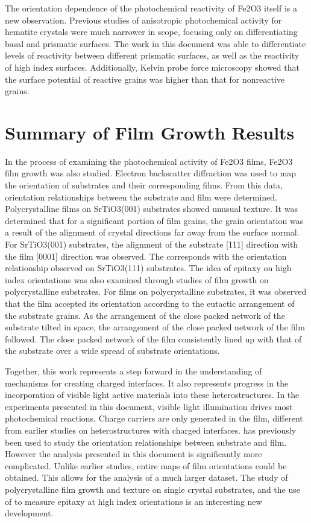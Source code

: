 \documentclass[12pt,%
              twoside,
               letterpaper]{uiothesis}
\begin{document}
The orientation dependence of the photochemical reactivity of Fe2O3 itself is a new
observation. Previous studies of anisotropic photochemical activity for hematite crystals
were much narrower in scope, focusing only on differentiating basal and prismatic
surfaces. The work in this document was able to differentiate levels of reactivity between
different prismatic surfaces, as well as the reactivity of high index surfaces.
Additionally, Kelvin probe force microscopy showed that the surface potential of reactive
grains was higher than that for nonreactive grains.


\section{Summary of Film Growth Results}
\label{sec:conclusions.growth.summary}


In the process of examining the photochemical activity of Fe2O3 films, Fe2O3
film growth was also studied. Electron backscatter diffraction was used to map the
orientation of substrates and their corresponding films. From this data, orientation
relationships between the substrate and film were determined. Polycrystalline films on
SrTiO3(001) substrates showed unusual texture. It was determined that for a
significant portion of film grains, the grain orientation was a result of the alignment of
crystal directions far away from the surface normal. For SrTiO3(001) substrates, the
alignment of the substrate [111] direction with the film [0001] direction was observed.
The corresponds with the orientation relationship observed on SrTiO3(111) substrates.
The idea of epitaxy on high index orientations was also examined through 
studies of film growth on polycrystalline substrates. For films on polycrystalline
substrates, it was observed that the film accepted its orientation according to the
eutactic arrangement of the substrate grains. As the arrangement of the close packed
network of the substrate tilted in space, the arrangement of the close packed network of
the film followed. The close packed network of the film consistently lined up with that of
the substrate over a wide spread of substrate orientations.

Together, this work represents a step forward in the understanding of mechanisms for
creating charged interfaces. It also represents progress in the incorporation of visible
light active materials into these heterostructures. In the experiments presented in this
document, visible light illumination drives most photochemical reactions. Charge carriers
are only generated in the film, different from earlier studies on heterostructures with
charged interfaces.  has previously been used to study the orientation
relationships between substrate and film. However the analysis presented in this document
is significantly more complicated. Unlike earlier studies, entire maps of film
orientations could be obtained. This allows for the analysis of a much larger dataset. The
study of polycrystalline film growth and texture on single crystal substrates, and the use
of  to measure epitaxy at high index orientations is an interesting new
development.
\end{document}
